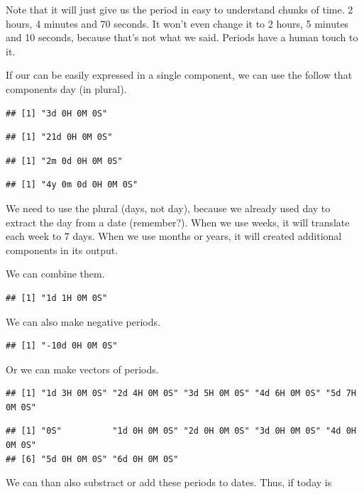 \documentclass[]{tufte-book}
\begin{document}
Note that it will just give us the period in easy to understand chunks of time. 2 hours, 4 minutes and 70 seconds. It won't even change it to 2 hours, 5 minutes and 10 seconds, because that's not what we said. Periods have a human touch to it.

If our can be easily expressed in a single component, we can use the follow that components day (in plural).

\begin{verbatim}
## [1] "3d 0H 0M 0S"
\end{verbatim}

\begin{verbatim}
## [1] "21d 0H 0M 0S"
\end{verbatim}

\begin{verbatim}
## [1] "2m 0d 0H 0M 0S"
\end{verbatim}

\begin{verbatim}
## [1] "4y 0m 0d 0H 0M 0S"
\end{verbatim}

We need to use the plural (days, not day), because we already used day to extract the day from a date (remember?). When we use weeks, it will translate each week to 7 days. When we use months or years, it will created additional components in its output.

We can combine them.

\begin{verbatim}
## [1] "1d 1H 0M 0S"
\end{verbatim}

We can also make negative periods.

\begin{verbatim}
## [1] "-10d 0H 0M 0S"
\end{verbatim}

Or we can make vectors of periods.

\begin{verbatim}
## [1] "1d 3H 0M 0S" "2d 4H 0M 0S" "3d 5H 0M 0S" "4d 6H 0M 0S" "5d 7H 0M 0S"
\end{verbatim}

\begin{verbatim}
## [1] "0S"          "1d 0H 0M 0S" "2d 0H 0M 0S" "3d 0H 0M 0S" "4d 0H 0M 0S"
## [6] "5d 0H 0M 0S" "6d 0H 0M 0S"
\end{verbatim}

We can than also substract or add these periods to dates. Thus, if today is
\end{document}
